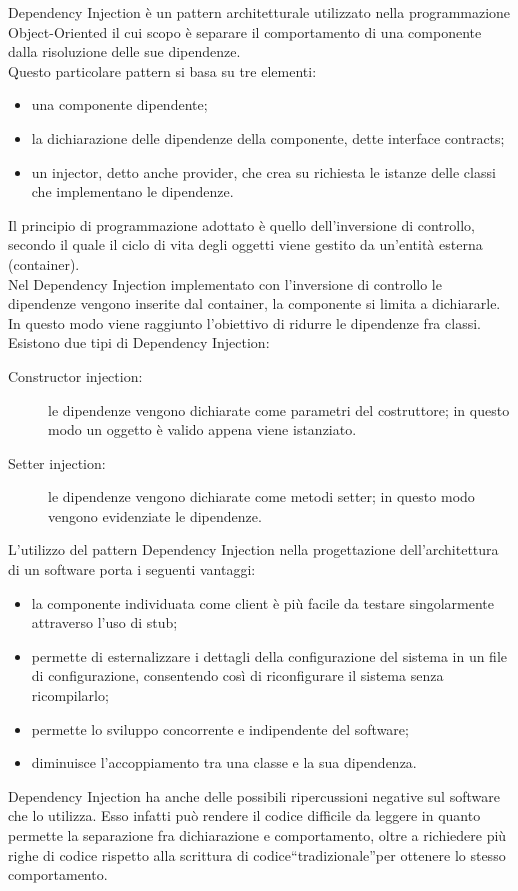 	 \label{app:dependencyinjection}
Dependency Injection è un pattern architetturale utilizzato nella programmazione Object-Oriented il cui scopo è separare il comportamento di una componente dalla risoluzione delle sue dipendenze. \\
Questo particolare pattern si basa su tre elementi:
\begin{itemize}
\item una componente dipendente;
\item la dichiarazione delle dipendenze della componente, dette interface contracts;
\item un injector, detto anche provider, che crea su richiesta le istanze delle classi che implementano le dipendenze.
\end{itemize}
Il principio di programmazione adottato è quello dell'inversione di controllo, secondo il quale il ciclo di vita degli oggetti viene gestito da un'entità esterna (container).\\
Nel Dependency Injection implementato con l'inversione di controllo le dipendenze vengono inserite dal container, la componente si limita a dichiararle. In questo modo viene raggiunto l'obiettivo di ridurre le dipendenze fra classi.\\
Esistono due tipi di Dependency Injection:
\begin{description}
	\item[Constructor injection:] le dipendenze vengono dichiarate come parametri del costruttore; in questo modo un oggetto è valido appena viene istanziato.
	\item[Setter injection:] le dipendenze vengono dichiarate come metodi setter; in questo modo vengono evidenziate le dipendenze.
\end{description}

L'utilizzo del pattern Dependency Injection nella progettazione dell'architettura di un software porta i seguenti vantaggi:
\begin{itemize}
\item la componente individuata come client è più facile da testare singolarmente attraverso l'uso di stub;
\item permette di esternalizzare i dettagli della configurazione del sistema in un file di configurazione, consentendo così di riconfigurare il sistema senza ricompilarlo;
\item permette lo sviluppo concorrente e indipendente del software;
\item diminuisce l'accoppiamento tra una classe e la sua dipendenza.
\end{itemize}
Dependency Injection ha anche delle possibili ripercussioni negative sul software che lo utilizza. Esso infatti può rendere il codice difficile da leggere in quanto permette la separazione fra dichiarazione e comportamento, oltre a richiedere più righe di codice rispetto alla scrittura di codice“tradizionale”per ottenere lo stesso comportamento.

